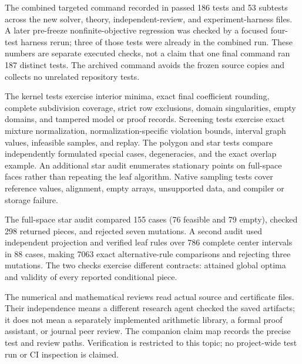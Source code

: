 The combined targeted command recorded in
 passed 186 tests and
53 subtests across the new solver, theory, independent-review, and
experiment-harness files. A later pre-freeze nonfinite-objective
regression was checked by a focused four-test harness rerun; three
of those tests were already in the combined run. These numbers are
separate executed checks, not a claim that one final command ran 187
distinct tests. The archived command avoids the frozen source copies
and collects no unrelated repository tests.

The kernel tests exercise interior minima, exact final coefficient
rounding, complete subdivision coverage, strict row exclusions,
domain singularities, empty domains, and tampered model or proof
records. Screening tests exercise exact mixture normalization,
normalization-specific violation bounds, interval graph values,
infeasible samples, and replay. The polygon and star tests compare
independently formulated special cases, degeneracies, and the exact
overlap example. An additional star audit enumerates stationary
points on full-space faces rather than repeating the leaf algorithm.
Native sampling tests cover reference values, alignment, empty arrays,
unsupported data, and compiler or storage failure.

The full-space star audit compared 155 cases (76 feasible and 79
empty), checked 298 returned pieces, and rejected seven mutations.
A second audit used independent projection and verified leaf rules
over 786 complete center intervals in 88 cases, making 7063 exact
alternative-rule comparisons and rejecting three mutations. The
two checks exercise different contracts: attained global optima and
validity of every reported conditional piece.

The numerical and mathematical reviews read actual source and
certificate files. Their independence means a different research
agent checked the saved artifacts; it does not mean a separately
implemented arithmetic library, a formal proof assistant, or journal
peer review. The companion claim map records the precise test and
review paths. Verification is restricted to this topic; no
project-wide test run or CI inspection is claimed.
